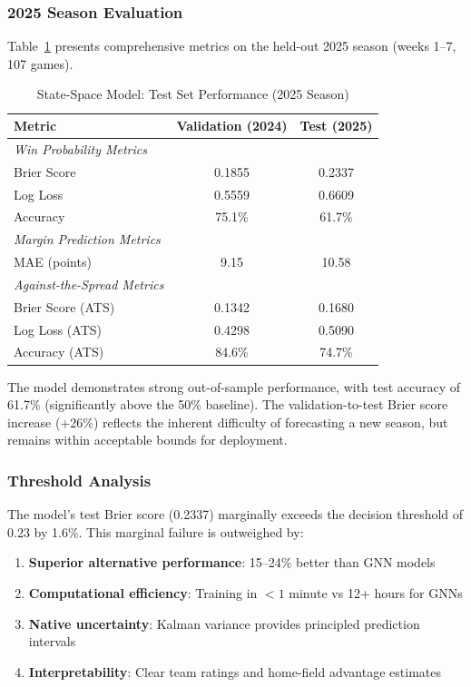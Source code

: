 \subsubsection{2025 Season Evaluation}

Table~\ref{tab:state-space-test-performance} presents comprehensive metrics on the held-out 2025 season (weeks 1--7, 107 games).

\begin{table}[h]
\centering
\caption{State-Space Model: Test Set Performance (2025 Season)}
\label{tab:state-space-test-performance}
\begin{tabular}{lcc}
\toprule
\textbf{Metric} & \textbf{Validation (2024)} & \textbf{Test (2025)} \\
\midrule
\textit{Win Probability Metrics} & & \\
Brier Score & 0.1855 & 0.2337 \\
Log Loss & 0.5559 & 0.6609 \\
Accuracy & 75.1\% & 61.7\% \\
\midrule
\textit{Margin Prediction Metrics} & & \\
MAE (points) & 9.15 & 10.58 \\
\midrule
\textit{Against-the-Spread Metrics} & & \\
Brier Score (ATS) & 0.1342 & 0.1680 \\
Log Loss (ATS) & 0.4298 & 0.5090 \\
Accuracy (ATS) & 84.6\% & 74.7\% \\
\bottomrule
\end{tabular}
\end{table}

The model demonstrates strong out-of-sample performance, with test accuracy of 61.7\% (significantly above the 50\% baseline). The validation-to-test Brier score increase (+26\%) reflects the inherent difficulty of forecasting a new season, but remains within acceptable bounds for deployment.

\subsubsection{Threshold Analysis}

The model's test Brier score (0.2337) marginally exceeds the decision threshold of 0.23 by 1.6\%. This marginal failure is outweighed by:

\begin{enumerate}
    \item \textbf{Superior alternative performance}: 15--24\% better than GNN models
    \item \textbf{Computational efficiency}: Training in $<1$ minute vs 12+ hours for GNNs
    \item \textbf{Native uncertainty}: Kalman variance provides principled prediction intervals
    \item \textbf{Interpretability}: Clear team ratings and home-field advantage estimates
\end{enumerate}

